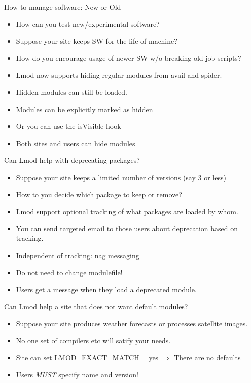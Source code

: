 \documentclass{beamer}
\begin{document}
\begin{frame}{How to manage software: New or Old}
  \begin{itemize}
    \item How can you test new/experimental software?
    \item Suppose your site keeps SW for the life of machine?
    \item How do you encourage usage of newer SW w/o breaking old job
      scripts?
    \item Lmod now supports hiding regular modules from avail and
      spider.
    \item Hidden modules can still be loaded.
    \item Modules can be explicitly marked as hidden
    \item Or you can use the isVisible hook
    \item Both sites and users can hide modules
  \end{itemize}
\end{frame}

\begin{frame}{Can Lmod help with deprecating packages?}
  \begin{itemize}
    \item Suppose your site keeps a limited number of versions (say 3
      or less)
    \item How to you decide which package to keep or remove?
    \item Lmod support optional tracking of what packages are loaded
      by whom.
    \item You can send targeted email to those users about
      deprecation based on tracking.
    \item Independent of tracking: nag messaging
    \item Do not need to change modulefile!
    \item Users get a message when they load a deprecated module. 
  \end{itemize}
\end{frame}

\begin{frame}{Can Lmod help a site that does not want default modules?}
  \begin{itemize}
    \item Suppose your site produces weather forecasts or processes
      satellite images.
    \item No one set of compilers etc will satify your needs.
    \item Site can set LMOD\_EXACT\_MATCH$=$yes $\Rightarrow$ There are no defaults
    \item Users \emph{MUST} specify name and version!
  \end{itemize}
\end{frame}
\end{document}
